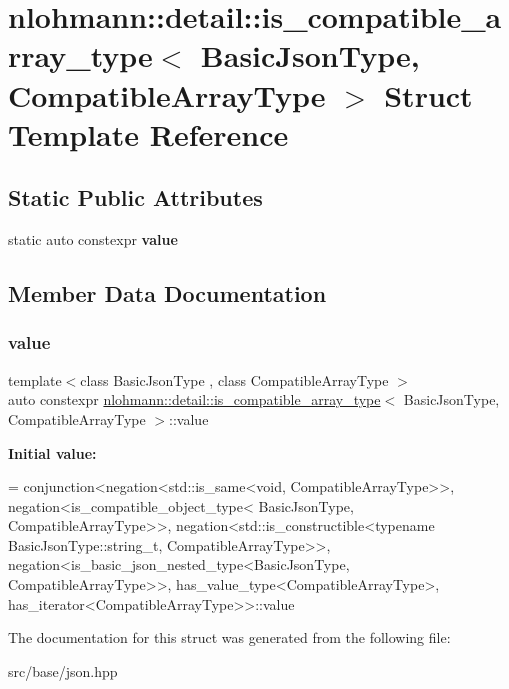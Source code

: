 \hypertarget{structnlohmann_1_1detail_1_1is__compatible__array__type}{}\section{nlohmann\+:\+:detail\+:\+:is\+\_\+compatible\+\_\+array\+\_\+type$<$ Basic\+Json\+Type, Compatible\+Array\+Type $>$ Struct Template Reference}
\label{structnlohmann_1_1detail_1_1is__compatible__array__type}
\subsection*{Static Public Attributes}
\begin{DoxyCompactItemize}
\item 
static auto constexpr {\bfseries value}
\end{DoxyCompactItemize}


\subsection{Member Data Documentation}
\mbox{\label{structnlohmann_1_1detail_1_1is__compatible__array__type_a01bc2274c22746bbb2cefd2acee8b572}} 
\subsubsection{\texorpdfstring{value}{value}}
{\footnotesize\ttfamily template$<$class Basic\+Json\+Type , class Compatible\+Array\+Type $>$ \\
auto constexpr \mbox{\hyperlink{structnlohmann_1_1detail_1_1is__compatible__array__type}{nlohmann\+::detail\+::is\+\_\+compatible\+\_\+array\+\_\+type}}$<$ Basic\+Json\+Type, Compatible\+Array\+Type $>$\+::value\hspace{0.3cm}{\ttfamily [static]}}

{\bfseries Initial value\+:}
\begin{DoxyCode}
=
        conjunction<negation<std::is\_same<void, CompatibleArrayType>>,
        negation<is\_compatible\_object\_type<
        BasicJsonType, CompatibleArrayType>>,
        negation<std::is\_constructible<\textcolor{keyword}{typename} BasicJsonType::string\_t,
        CompatibleArrayType>>,
        negation<is\_basic\_json\_nested\_type<BasicJsonType, CompatibleArrayType>>,
        has\_value\_type<CompatibleArrayType>,
        has\_iterator<CompatibleArrayType>>::value
\end{DoxyCode}


The documentation for this struct was generated from the following file\+:\begin{DoxyCompactItemize}
\item 
src/base/json.\+hpp\end{DoxyCompactItemize}
